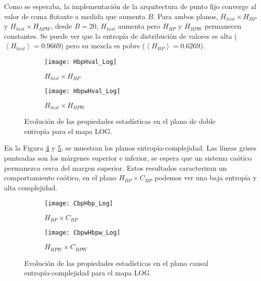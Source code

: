 Como se esperaba, la implementación de la arquitectura de punto fijo converge al valor de coma flotante a medida que aumenta $B$.
Para ambos planos, $H_{hist} \times H_{BP}$ y $H_{hist} \times H_{BPW}$, desde $B = 20$, $H_{hist}$ aumenta pero $H_{BP}$ y $H_{BPW}$ permanecen constantes.
Se puede ver que la entropía de distribución de valores es alta ($\left \langle H_{hist} \right \rangle = 0.9669$) pero su mezcla es pobre ($\left \langle H_{BP} \right \rangle = 0.6269$).
%
\begin{figure}[htpb]
	\centering
	\begin{subfigure}[b]{0.49\textwidth}
		\texttt{[image: HbpHval\_Log]}
		\caption{$H_{hist} \times H_{BP}$}
		\label{fig:HbpHval_Log}
	\end{subfigure}
	\begin{subfigure}[b]{0.49\textwidth}
		\texttt{[image: HbpwHval\_Log]}
		\caption{$H_{hist} \times H_{BPW}$}
		\label{fig:HbpwHval_Log}
	\end{subfigure}
	\caption{Evolución de las propiedades estadísticas en el plano de doble entropía para el mapa LOG.}
	\label{fig:LOG_HH}
\end{figure}

En la Figura \ref{fig:CbpHbp_Log} y \ref{fig:CbpwHbpw_Log}, se muestran los planos entropía-complejidad.
Las líneas grises punteadas son los márgenes superior e inferior, se espera que un sistema caótico permanezca cerca del margen superior.
Estos resultados caracterizan un comportamiento caótico, en el plano $H_{BP} \times C_{BP}$ podemos ver una baja entropía y alta complejidad.
%
\begin{figure}[htpb]
	\centering
	\begin{subfigure}[b]{0.49\textwidth}
		\texttt{[image: CbpHbp\_Log]}
		\caption{$H_{BP} \times C_{BP}$}
		\label{fig:CbpHbp_Log}
	\end{subfigure}
	\begin{subfigure}[b]{0.49\textwidth}
		\texttt{[image: CbpwHbpw\_Log]}
		\caption{$H_{BPW} \times C_{BPW}$}
		\label{fig:CbpwHbpw_Log}
	\end{subfigure}
	\caption{Evolución de las propiedades estadísticas en el plano causal entropía-complejidad para el mapa LOG.}
	\label{fig:LOG_HC}
\end{figure}
